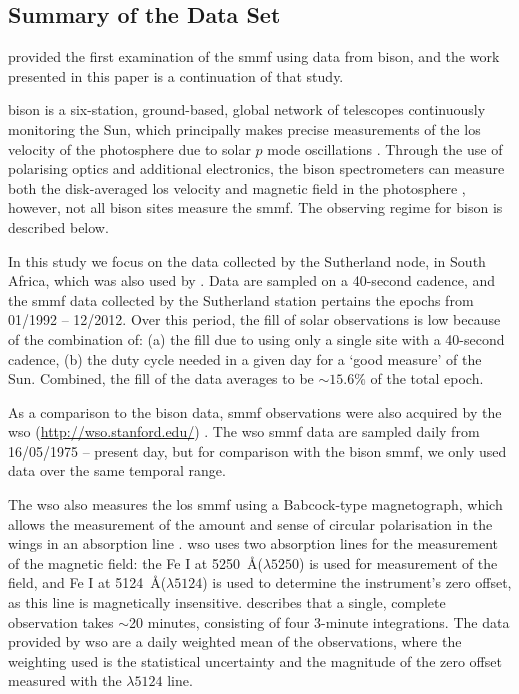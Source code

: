 \subsection{Summary of the Data Set}

\citet{chaplin_studies_2003} provided the first examination of the \gls{smmf} using data from \gls{bison}, and the work presented in this paper is a continuation of that study.

\gls{bison} is a six-station, ground-based, global network of telescopes continuously monitoring the Sun, which principally makes precise measurements of the \gls{los} velocity of the photosphere due to solar $p$ mode oscillations \citep{hale_performance_2016}. Through the use of polarising optics and additional electronics, the \gls{bison} spectrometers can measure both the disk-averaged \gls{los} velocity and magnetic field in the photosphere \citep{chaplin_studies_2003}, however, not all \gls{bison} sites measure the \gls{smmf}. The observing regime for \gls{bison} is described below.

In this study we focus on the data collected by the Sutherland node, in South Africa, which was also used by \cite{chaplin_studies_2003}. Data are sampled on a 40-second cadence, and the \gls{smmf} data collected by the Sutherland station pertains the epochs from 01/1992 -- 12/2012. Over this period, the fill of solar observations is low because of the combination of: (a) the fill due to using only a single site with a 40-second cadence, (b) the duty cycle needed in a given day for a `good measure' of the Sun. Combined, the fill of the data averages to be $\sim 15.6\%$ of the total epoch.

As a comparison to the \gls{bison} data, \gls{smmf} observations were also acquired by the \gls{wso} (\url{http://wso.stanford.edu/}) \citep{scherrer_mean_1977-1}. The \gls{wso} \gls{smmf} data are sampled daily from 16/05/1975 -- present day, but for comparison with the \gls{bison} \gls{smmf}, we only used data over the same temporal range.

The \gls{wso} also measures the \gls{los} \gls{smmf} using a Babcock-type magnetograph, which allows the measurement of the amount and sense of circular polarisation in the wings in an absorption line \citep{scherrer_mean_1977}. \gls{wso} uses two absorption lines for the measurement of the magnetic field: the Fe I at 5250~\AA ($\lambda 5250$) is used for measurement of the field, and Fe I at 5124~\AA ($\lambda 5124$) is used to determine the instrument's zero offset, as this line is magnetically insensitive. \cite{scherrer_mean_1977} describes that a single, complete observation takes $\sim$20 minutes, consisting of four 3-minute integrations. The data provided by \gls{wso} are a daily weighted mean of the observations, where the weighting used is the statistical uncertainty and the magnitude of the zero offset measured with the $\lambda 5124$ line.


